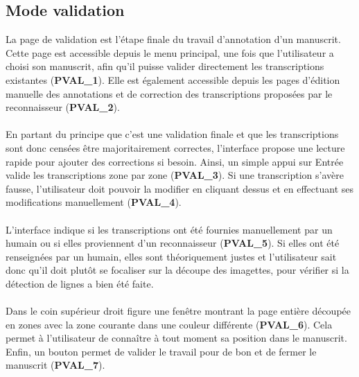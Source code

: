 \subsection{Mode validation}

La page de validation est l’étape finale du travail d’annotation d’un
manuscrit. Cette page est accessible depuis le menu principal, une fois que
l’utilisateur a choisi son manuscrit, afin qu’il puisse valider directement les
transcriptions existantes (\textbf{PVAL\_1}). Elle est également accessible
depuis les pages d’édition manuelle des annotations et de correction des
transcriptions proposées par le reconnaisseur (\textbf{PVAL\_2}).

\paragraph{}
En partant du principe que c’est une validation finale et que les
transcriptions sont donc censées être majoritairement correctes, l’interface
propose une lecture rapide pour ajouter des corrections si besoin. Ainsi, un
simple appui sur Entrée valide les transcriptions zone par zone
(\textbf{PVAL\_3}). Si une transcription s’avère fausse, l’utilisateur doit
pouvoir la modifier en cliquant dessus et en effectuant ses modifications
manuellement (\textbf{PVAL\_4}).

\paragraph{}
L’interface indique si les transcriptions ont été fournies manuellement par un
humain ou si elles proviennent d’un reconnaisseur (\textbf{PVAL\_5}). Si elles
ont été renseignées par un humain, elles sont théoriquement justes et
l’utilisateur sait donc qu’il doit plutôt se focaliser sur la découpe des
imagettes, pour vérifier si la détection de lignes a bien été faite.

\paragraph{}
Dans le coin supérieur droit figure une fenêtre montrant la page entière
découpée en zones avec la zone courante dans une couleur différente
(\textbf{PVAL\_6}). Cela permet à l’utilisateur de connaître à tout moment sa
position dans le manuscrit. Enfin, un bouton permet de valider le travail pour
de bon et de fermer le manuscrit (\textbf{PVAL\_7}).

\newpage

